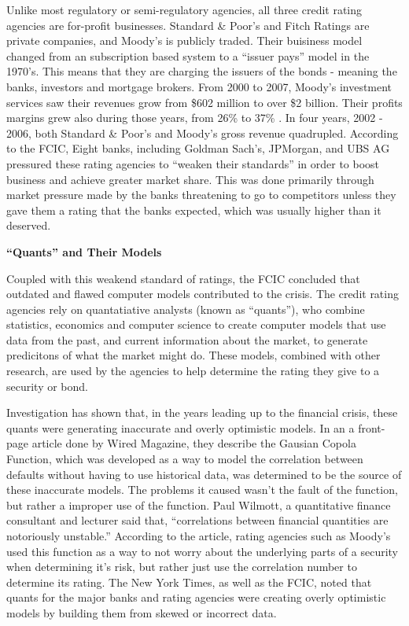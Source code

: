 \documentclass[11pt]{article}
\begin{document}
\begin{multicols}{2}
Unlike most regulatory or semi-regulatory agencies, all three credit rating agencies are for-profit businesses.  Standard \& Poor's and Fitch Ratings are private companies, and Moody's is publicly traded.  Their buisiness model changed from an subscription based system to a ``issuer pays'' model in the 1970's. \cite{CivilLiability, gatekeepers}  This means that they are charging the issuers of the bonds - meaning the banks, investors and mortgage brokers.  From 2000 to 2007, Moody's investment services saw their revenues grow from \$602 million to over \$2 billion. Their profits margins grew also during those years, from 26\% to 37\% \cite[p.149]{govtReport}.  In four years, 2002 - 2006, both Standard \& Poor's and Moody's gross revenue quadrupled.  According to the FCIC, Eight banks, including Goldman Sach's, JPMorgan, and UBS AG pressured these rating agencies to ``weaken their standards'' in order to boost business and achieve greater market share. \cite{ratingEthics} This was done primarily through market pressure made by the banks threatening to go to competitors unless they gave them a rating that the banks expected, which was usually higher than it deserved. \cite[p.210]{govtReport}

\textbf{``Quants'' and Their Models}

Coupled with this weakend standard of ratings, the FCIC concluded that outdated and flawed computer models contributed to the crisis. \cite[p.~xxv]{govtReport} The credit rating agencies rely on quantatiative analysts (known as ``quants''), who combine statistics, economics and computer science to create computer models that use data from the past, and current information about the market, to generate predicitons of what the market might do. These models, combined with other research, are used by the agencies to help determine the rating they give to a security or bond.\cite{quantsRole} 

Investigation has shown that, in the years leading up to the financial crisis, these quants were generating inaccurate and overly optimistic models.  In an a front-page article done by Wired Magazine, they describe the Gausian Copola Function, which was developed as a way to model the correlation between defaults without having to use historical data, was determined to be the source of these inaccurate models. \cite{wiredFormula} The problems it caused wasn't the fault of the function, but rather a improper use of the function.  Paul Wilmott, a quantitative finance consultant and lecturer said that, ``correlations between financial quantities are notoriously unstable.'' \cite{wiredFormula} According to the article, rating agencies such as Moody's used this function as a way to not worry about the underlying parts of a security when determining it's risk, but rather just use the correlation number to determine its rating.  The New York Times, as well as the FCIC, noted that quants for the major banks and rating agencies were creating overly optimistic models by building them from skewed or incorrect data. \cite{nyTimesQuants, govtReport}


\end{multicols}
\end{document}
